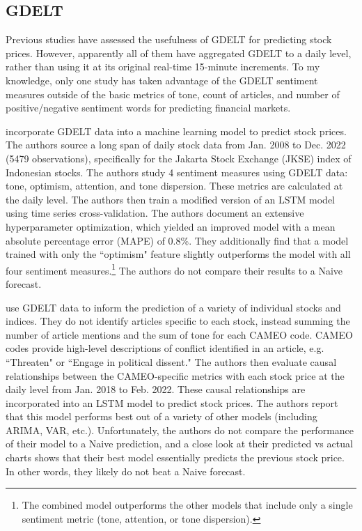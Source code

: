 \documentclass[12pt]{article}
\begin{document}
\subsection{GDELT}
Previous studies have assessed the usefulness of GDELT for predicting stock prices. However, apparently all of them have aggregated GDELT to a daily level, rather than using it at its original real-time 15-minute increments. To my knowledge, only one study has taken advantage of the GDELT sentiment measures outside of the basic metrics of tone, count of articles, and number of positive/negative sentiment words for predicting financial markets.

\textcite{nashir2023indonesian} incorporate GDELT data into a machine learning model to predict stock prices. The authors source a long span of daily stock data from Jan. 2008 to Dec. 2022 (5479 observations), specifically for the Jakarta Stock Exchange (JKSE) index of Indonesian stocks. The authors study 4 sentiment measures using GDELT data: tone, optimism, attention, and tone dispersion. These metrics are calculated at the daily level. The authors then train a modified version of an LSTM model using time series cross-validation. The authors document an extensive hyperparameter optimization, which yielded an improved model with a mean absolute percentage error (MAPE) of 0.8\%. They additionally find that a model trained with only the ``optimism" feature slightly outperforms the model with all four sentiment measures.\footnote{The combined model outperforms the other models that include only a single sentiment metric (tone, attention, or tone dispersion).} The authors do not compare their results to a Naive forecast.

\textcite{wang2024ensemble} use GDELT data to inform the prediction of a variety of individual stocks and indices. They do not identify articles specific to each stock, instead summing the number of article mentions and the sum of tone for each CAMEO code. CAMEO codes provide high-level descriptions of conflict identified in an article, e.g. ``Threaten" or ``Engage in political dissent." The authors then evaluate causal relationships between the CAMEO-specific metrics with each stock price at the daily level from Jan. 2018 to Feb. 2022. These causal relationships are incorporated into an LSTM model to predict stock prices. The authors report that this model performs best out of a variety of other models (including ARIMA, VAR, etc.). Unfortunately, the authors do not compare the performance of their model to a Naive prediction, and a close look at their predicted vs actual charts shows that their best model essentially predicts the previous stock price. In other words, they likely do not beat a Naive forecast.
\end{document}
